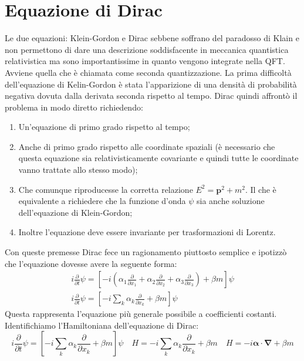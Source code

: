 \section{Equazione di Dirac}
Le due equazioni: Klein-Gordon e Dirac sebbene soffrano del paradosso di Klain e non permettono di dare una descrizione soddisfacente in meccanica quantistica relativistica ma sono importantissime in quanto vengono integrate nella QFT. Avviene quella che è chiamata come seconda quantizzazione. La prima difficoltà dell'equazione di Kelin-Gordon è stata l'apparizione di una densità di probabilità negativa dovuta dalla derivata seconda rispetto al tempo. Dirac quindi affrontò il problema in modo diretto richiedendo:
\begin{enumerate}
    \item Un'equazione di primo grado rispetto al tempo;
    \item Anche di primo grado rispetto alle coordinate spaziali (è necessario che questa equazione sia relativisticamente covariante e quindi tutte le coordinate vanno trattate allo stesso modo);
    \item Che comunque riproducesse la corretta relazione $E^2=\mathbf{p}^2+m^2$. Il che è equivalente a richiedere che la funzione d'onda $\psi$ sia anche soluzione dell'equazione di Klein-Gordon;
    \item Inoltre l'equazione deve essere invariante per trasformazioni di Lorentz.
\end{enumerate}
Con queste premesse Dirac fece un ragionamento piuttosto semplice e ipotizzò che l'equazione dovesse avere la seguente forma:
\begin{equation}
    \begin{gathered}i \frac{\partial}{\partial t} \psi=\left[-i\left(\alpha_1 \frac{\partial}{\partial x_1}+\alpha_2 \frac{\partial}{\partial x_2}+\alpha_3 \frac{\partial}{\partial x_3}\right)+\beta m\right] \psi \\ i \frac{\partial}{\partial t} \psi=\left[-i \sum_k \alpha_k \frac{\partial}{\partial x_k}+\beta m\right] \psi\end{gathered}
\end{equation}
Questa rappresenta l'equazione più generale possibile a coefficienti costanti. Identifichiamo l'Hamiltoniana dell'equazione di Dirac:
\begin{equation*}
    i \frac{\partial}{\partial t} \psi=\left[-i \sum_k \alpha_k \frac{\partial}{\partial x_k}+\beta m\right] \psi \quad H=-i \sum_k \alpha_k \frac{\partial}{\partial x_k}+\beta m \quad H = -i\boldsymbol{\alpha} \cdot\mathbf{\nabla}+\beta m
\end{equation*}
